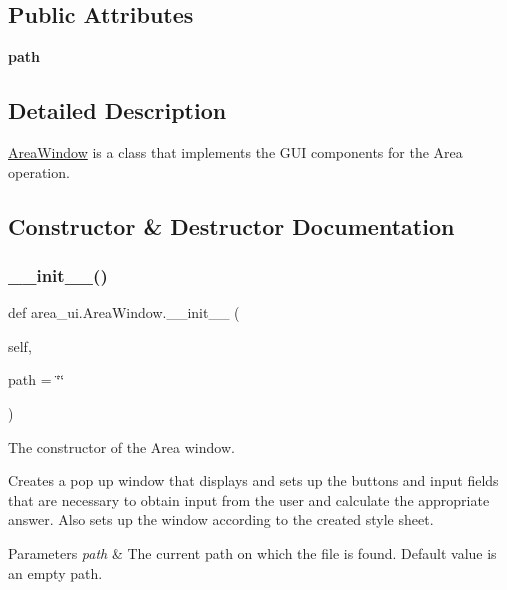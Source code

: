 \subsection*{Public Attributes}
\begin{DoxyCompactItemize}
\item 
\mbox{\label{classarea__ui_1_1_area_window_a78ffcbed4656d6e098b73228423db2f8}} 
{\bfseries path}
\end{DoxyCompactItemize}


\subsection{Detailed Description}
\hyperlink{classarea__ui_1_1_area_window}{Area\+Window} is a class that implements the G\+UI components for the Area operation. 

\subsection{Constructor \& Destructor Documentation}
\mbox{\label{classarea__ui_1_1_area_window_a4147cce2b2137dde0a7ac73901b8d9a4}} 
\subsubsection{\texorpdfstring{\+\_\+\+\_\+init\+\_\+\+\_\+()}{\_\_init\_\_()}}
{\footnotesize\ttfamily def area\+\_\+ui.\+Area\+Window.\+\_\+\+\_\+init\+\_\+\+\_\+ (\begin{DoxyParamCaption}\item[{}]{self,  }\item[{}]{path = {\ttfamily \char`\"{}\char`\"{}} }\end{DoxyParamCaption})}



The constructor of the Area window. 

Creates a pop up window that displays and sets up the buttons and input fields that are necessary to obtain input from the user and calculate the appropriate answer. Also sets up the window according to the created style sheet. 
\begin{DoxyParams}{Parameters}
{\em path} & The current path on which the file is found. Default value is an empty path. \\
\hline
\end{DoxyParams}


